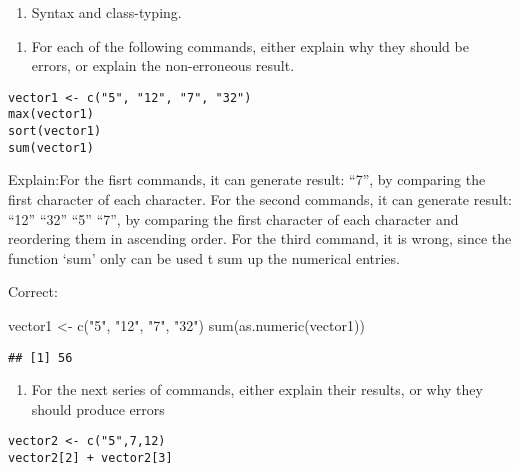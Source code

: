 \documentclass[
]{article}
\newenvironment{Shaded}{\begin{snugshade}}{\end{snugshade}}
\newcommand{\FunctionTok}[1]{\textcolor[rgb]{0.00,0.00,0.00}{#1}}
\newcommand{\NormalTok}[1]{#1}
\newcommand{\OtherTok}[1]{\textcolor[rgb]{0.56,0.35,0.01}{#1}}
\newcommand{\StringTok}[1]{\textcolor[rgb]{0.31,0.60,0.02}{#1}}
\providecommand{\tightlist}{%
  \setlength{\itemsep}{0pt}\setlength{\parskip}{0pt}}
\begin{document}
\begin{enumerate}
\def\labelenumi{\arabic{enumi}.}
\setcounter{enumi}{1}
\tightlist
\item
  Syntax and class-typing.
\end{enumerate}

\begin{enumerate}
\def\labelenumi{\alph{enumi}.}
\tightlist
\item
  For each of the following commands, either explain why they should be
  errors, or explain the non-erroneous result.
\end{enumerate}

\begin{verbatim}
vector1 <- c("5", "12", "7", "32")
max(vector1)
sort(vector1)
sum(vector1)
\end{verbatim}

Explain:For the fisrt commands, it can generate result: ``7'', by
comparing the first character of each character. For the second
commands, it can generate result: ``12'' ``32'' ``5'' ``7'', by
comparing the first character of each character and reordering them in
ascending order. For the third command, it is wrong, since the function
`sum' only can be used t sum up the numerical entries.

Correct:

\begin{Shaded}
\begin{Highlighting}[]
\NormalTok{vector1 }\OtherTok{\textless{}{-}} \FunctionTok{c}\NormalTok{(}\StringTok{"5"}\NormalTok{, }\StringTok{"12"}\NormalTok{, }\StringTok{"7"}\NormalTok{, }\StringTok{"32"}\NormalTok{)}
\FunctionTok{sum}\NormalTok{(}\FunctionTok{as.numeric}\NormalTok{(vector1))}
\end{Highlighting}
\end{Shaded}

\begin{verbatim}
## [1] 56
\end{verbatim}

\begin{enumerate}
\def\labelenumi{\alph{enumi}.}
\setcounter{enumi}{1}
\tightlist
\item
  For the next series of commands, either explain their results, or why
  they should produce errors
\end{enumerate}

\begin{verbatim}
vector2 <- c("5",7,12)
vector2[2] + vector2[3]
\end{verbatim}
\end{document}
